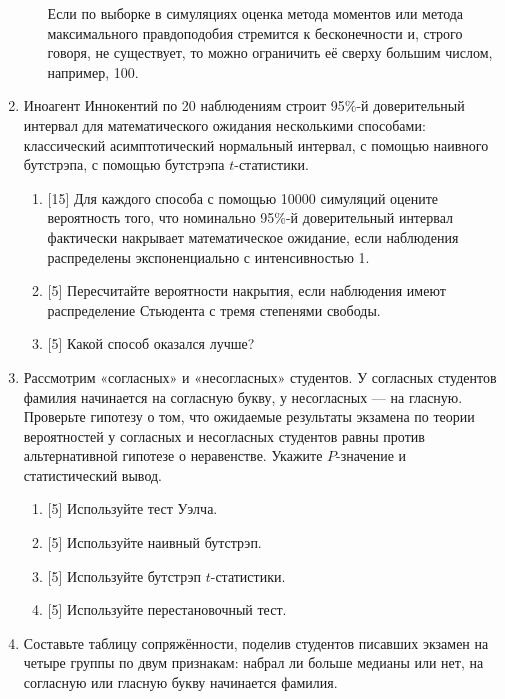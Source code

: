 \documentclass[12pt]{article} %
\begin{document}
\begin{enumerate}
\begin{enumerate}
      Если по выборке в симуляциях оценка метода моментов или метода максимального правдоподобия стремится к бесконечности и, строго говоря, не существует,
      то можно ограничить её сверху большим числом, например, 100.
    \end{enumerate}

    
    
    \item Иноагент Иннокентий по 20 наблюдениям строит 95\%-й доверительный интервал для математического ожидания
    несколькими способами: классический асимптотический нормальный интервал, 
    с помощью наивного бутстрэпа, с помощью бутстрэпа $t$-статистики.

    
    \begin{enumerate}
      \item {[15]} Для каждого способа с помощью 10000 симуляций оцените 
      вероятность того, что номинально 95\%-й доверительный интервал фактически накрывает математическое ожидание,
      если наблюдения распределены экспоненциально с интенсивностью 1. 
      \item {[5]} Пересчитайте вероятности накрытия, если наблюдения имеют распределение Стьюдента с тремя степенями свободы.
      \item {[5]} Какой способ оказался лучше?
    \end{enumerate}
  

    \item Рассмотрим «согласных» и «несогласных» студентов. У согласных студентов фамилия начинается на согласную букву, у несогласных — на гласную. Проверьте гипотезу о том, что ожидаемые результаты экзамена по теории вероятностей у согласных и несогласных студентов равны против альтернативной гипотезе о неравенстве.
    Укажите $P$-значение и статистический вывод.

    \begin{enumerate}
      \item {[5]} Используйте тест Уэлча. 
      \item {[5]} Используйте наивный бутстрэп. 
      \item {[5]} Используйте бутстрэп $t$-статистики. 
      \item {[5]} Используйте перестановочный тест.
    \end{enumerate}

  \item Составьте таблицу сопряжённости, поделив студентов писавших экзамен на четыре группы по двум признакам:
  набрал ли больше медианы или нет, на согласную или гласную букву начинается фамилия. 


\end{enumerate}
\end{document}
